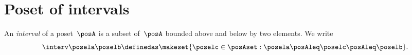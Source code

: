 
\section{Poset of intervals}
\begin{definition}[Interval]
	\label{def:interval}
	An \emph{interval} of a poset~$\posA$ is a subset of~$\posA$ bounded above and below by two elements.
	We write
	\begin{equation}
		\interv \posela \poselb
		\definedas
		\makeset{
			\poselc \in \posAset :
			\posela \posAleq \poselc \posAleq \poselb
		}.
	\end{equation}
\end{definition}

